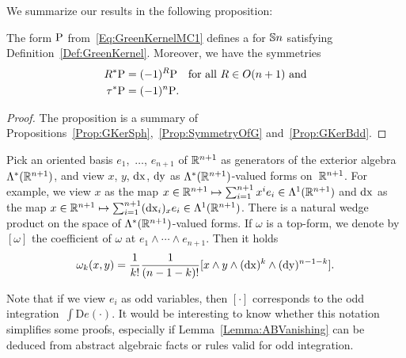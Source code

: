 \documentclass[\MainFolder/Text.tex]{subfiles}
\begin{document}
We summarize our results in the following proposition:

\begin{Proposition}\label{Proposition:GreenKernel}
The form $\mathrm{P}$ from~\eqref{Eq:GreenKernelMC1} defines a  for $\mathbb{S}{n}$ satisfying Definition~\ref{Def:GreenKernel}. Moreover, we have the symmetries
\begin{align*}
R^* \mathrm{P} &= (-1)^R \mathrm{P}\quad \text{for all }R\in O(n+1)\text{ and} \\
\tau^* \mathrm{P} & = (-1)^n \mathrm{P}.
\end{align*}
\end{Proposition}
\begin{proof}
The proposition is a summary of Propositions~\ref{Prop:GKerSph},~\ref{Prop:SymmetryOfG} and~\ref{Prop:GKerBdd}.
\end{proof}

\begin{Remark} \label{Remark:Bryant}
Pick an oriented basis $e_1$,~$ \dotsc$, $e_{n+1}$ of $\mathbb{R}^{n+1}$ as generators of the exterior algebra $\Lambda^*(\mathbb{R}^{n+1})$, and view $x$, $y$, $\operatorname{dx}$, $\operatorname{dy}$ as $\Lambda^*(\mathbb{R}^{n+1})$-valued forms on~$\mathbb{R}^{n+1}$. For example, we view $x$ as the map $x\in \mathbb{R}^{n+1} \mapsto \sum_{i=1}^{n+1} x^i e_i \in \Lambda^1(\mathbb{R}^{n+1})$ and $\operatorname{dx}$ as the map $x\in \mathbb{R}^{n+1} \mapsto \sum_{i=1}^{n+1} (\operatorname{dx}_i)_x e_i \in \Lambda^1(\mathbb{R}^{n+1})$. There is a natural wedge product on the space of $\Lambda^*(\mathbb{R}^{n+1})$-valued forms. If $\omega$ is a top-form, we denote by $[\omega]$ the coefficient of $\omega$ at $e_1 \wedge \dotsm \wedge e_{n+1}$. Then it holds
$$ \omega_k(x,y) = \frac{1}{k!}\frac{1}{(n-1-k)!}[x\wedge y \wedge (\operatorname{dx})^{k} \wedge (\operatorname{dy})^{n-1-k}]. $$

Note that if we view $e_i$ as odd variables, then $[\cdot]$ corresponds to the odd integration~$\int \mathrm{D}e(\cdot)$. It would be interesting to know whether this notation simplifies some proofs, especially if Lemma~\ref{Lemma:ABVanishing} can be deduced from abstract algebraic facts or rules valid for odd integration.
\end{Remark}
\end{document}
